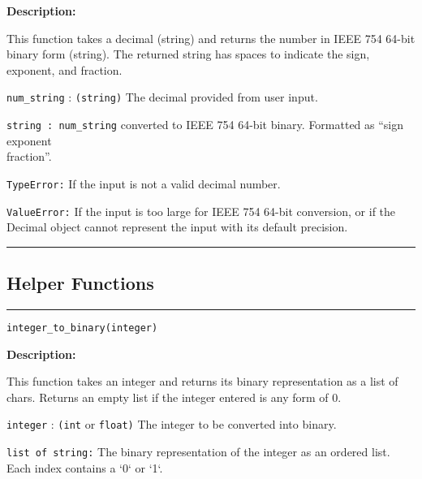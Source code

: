 \documentclass[12pt]{article}
\begin{document}
\textbf{Description:}

This function takes a decimal (string) and returns the number in IEEE 754 64-bit binary form (string). The returned string has spaces to indicate the sign, exponent, and fraction.

\begin{description}
    \item[Parameters:] 
    \item \texttt{num\_string} : \texttt{(string)} The decimal provided from user input.

    \item[Returns:] 
    \item \texttt{string : num\_string} converted to IEEE 754 64-bit binary. Formatted as ``sign exponent\\ fraction''.

    \item[Raises:] 
    \item \texttt{TypeError:} If the input is not a valid decimal number.
    \item \texttt{ValueError:} If the input is too large for IEEE 754 64-bit conversion, or if the Decimal object cannot represent the input with its default precision. \\
\end{description}

\hrule
\subsection*{Helper Functions\\}
\hrule
{\large\texttt{integer\_to\_binary(integer)}}

\textbf{Description:}

This function takes an integer and returns its binary representation as a list of chars. Returns an empty list if the integer entered is any form of 0.

\begin{description}
    \item[Parameters:] 
    \item \texttt{integer} : \texttt{(int} or \texttt{float)} The integer to be converted into binary.

    \item[Returns:] 
    \item \texttt{list of string:} The binary representation of the integer as an ordered list. Each index contains a `0` or `1`.\\
\end{description}
\end{document}
